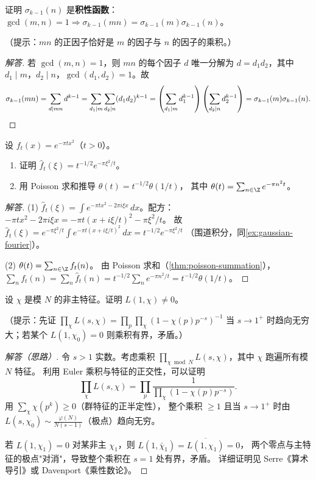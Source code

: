 \begin{exercise}
\label{ex:ch2-sigma-multiplicative}
证明 $\sigma_{k-1}(n)$ 是\textbf{积性函数}：$\gcd(m,n)=1 \Rightarrow \sigma_{k-1}(mn) = \sigma_{k-1}(m)\sigma_{k-1}(n)$。

（提示：$mn$ 的正因子恰好是 $m$ 的因子与 $n$ 的因子的乘积。）
\end{exercise}

\begin{proof}[解答]
若 $\gcd(m,n)=1$，则 $mn$ 的每个因子 $d$ 唯一分解为 $d = d_1 d_2$，其中 $d_1 \mid m$，$d_2 \mid n$，$\gcd(d_1, d_2) = 1$。故
\[
  \sigma_{k-1}(mn) = \sum_{d \mid mn} d^{k-1}
  = \sum_{d_1 \mid m}\sum_{d_2 \mid n} (d_1 d_2)^{k-1}
  = \left(\sum_{d_1 \mid m} d_1^{k-1}\right)\left(\sum_{d_2 \mid n} d_2^{k-1}\right)
  = \sigma_{k-1}(m)\sigma_{k-1}(n). \qedhere
\]
\end{proof}

\begin{exercise}
\label{ex:ch2-poisson-gaussian}
设 $f_t(x) = e^{-\pi t x^2}$（$t > 0$）。
\begin{enumerate}
  \item 证明 $\hat{f}_t(\xi) = t^{-1/2} e^{-\pi\xi^2/t}$。
  \item 用 Poisson 求和推导 $\theta(t) = t^{-1/2}\theta(1/t)$，
    其中 $\theta(t) = \sum_{n \in \Z} e^{-\pi n^2 t}$。
\end{enumerate}
\end{exercise}

\begin{proof}[解答]
(1) $\hat{f}_t(\xi) = \int e^{-\pi tx^2 - 2\pi i\xi x}\,dx$。配方：
$-\pi t x^2 - 2\pi i\xi x = -\pi t(x + i\xi/t)^2 - \pi\xi^2/t$。
故 $\hat{f}_t(\xi) = e^{-\pi\xi^2/t} \int e^{-\pi t(x+i\xi/t)^2}\,dx = t^{-1/2} e^{-\pi\xi^2/t}$
（围道积分，同\cref{ex:gaussian-fourier}）。

(2) $\theta(t) = \sum_{n \in \Z} f_t(n)$。
由 Poisson 求和（\cref{thm:poisson-summation}），
$\sum_n f_t(n) = \sum_n \hat{f}_t(n) = t^{-1/2}\sum_n e^{-\pi n^2/t} = t^{-1/2}\theta(1/t)$。
\end{proof}

\begin{exercise}
\label{ex:ch2-dirichlet-L-s1}
设 $\chi$ 是模 $N$ 的非主特征。证明 $L(1,\chi) \neq 0$。

（提示：先证 $\prod_\chi L(s,\chi) = \prod_p \prod_\chi (1 - \chi(p)p^{-s})^{-1}$
当 $s \to 1^+$ 时趋向无穷大；若某个 $L(1,\chi_0^{}) = 0$ 则乘积有界，矛盾。）
\end{exercise}

\begin{proof}[解答（思路）]
令 $s > 1$ 实数。考虑乘积
$\prod_{\chi \bmod N} L(s, \chi)$，其中 $\chi$ 跑遍所有模 $N$ 特征。
利用 Euler 乘积与特征的正交性，可以证明
\[
  \prod_{\chi} L(s, \chi) = \prod_{p} \frac{1}{\prod_\chi(1 - \chi(p)p^{-s})}.
\]
用 $\sum_\chi \chi(p^k) \geq 0$（群特征的正半定性），
整个乘积 $\geq 1$ 且当 $s \to 1^+$ 时由 $L(s, \chi_0) \sim \frac{\varphi(N)}{N(s-1)}$（极点）趋向无穷。

若 $L(1, \chi_1) = 0$ 对某非主 $\chi_1$，则 $L(1, \bar\chi_1) = \overline{L(1,\chi_1)} = 0$，
两个零点与主特征的极点"对消"，导致整个乘积在 $s = 1$ 处有界，矛盾。
详细证明见 Serre《算术导引》或 Davenport《乘性数论》。
\end{proof}
